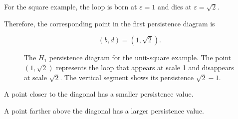 \documentclass[oneside,english,11pt]{article}
\begin{document}
For the square example, the loop is born
at $\varepsilon=1$ and dies at
$\varepsilon=\sqrt{2}$.

Therefore, the corresponding point in
the first persistence diagram is

\begin{equation}
(b,d)=(1,\sqrt{2}).
\end{equation}

\begin{figure}[htbp]
\centering


\caption{
The $H_1$ persistence diagram for the
unit-square example.
The point $(1,\sqrt{2})$ represents
the loop that appears at scale 1
and disappears at scale $\sqrt{2}$.
The vertical segment shows its persistence
$\sqrt{2}-1$.
}

\label{fig:persistence_square}

\end{figure}

\noindent
A point closer to the diagonal has
a smaller persistence value.

A point farther above the diagonal
has a larger persistence value.
\end{document}
